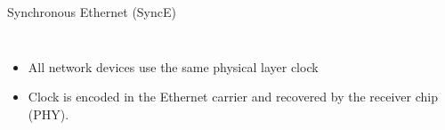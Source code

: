 \documentclass[compress,red]{beamer}
\begin{document}
\begin{frame}{Synchronous Ethernet (SyncE)}

\begin{columns}[c]
    \begin{itemize}    
      \item All network devices use the same physical layer clock
      \item Clock is encoded in the Ethernet carrier and recovered by the receiver chip (PHY).
    \end{itemize}
    \vspace{6.7cm}
\end{columns}

\end{frame}
\end{document}
